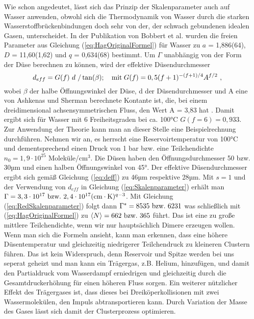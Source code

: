 Wie schon angedeutet, lässt sich das Prinzip der Skalenparameter auch auf Wasser anwenden, obwohl sich die Thermodynamik von Wasser durch die starken Wasserstoffbrückenbindungen doch sehr von der, der schwach gebundenen idealen Gasen, unterscheidet. In der Publikation von Bobbert et al. \cite{bobbert2002} wurden die freien Parameter aus Gleichung (\ref{eq:HagOriginalFormel}) für Wasser zu $a$ = 1,886(64), $D$ = 11,60(1,62) und $q$ = 0,634(68) bestimmt. Um $\Gamma$ unabhängig von der Form der Düse berechnen zu können, wird der effektive Düsendurchmesser
%
\begin{equation} \label{eq:deff}
d_{eff} = G(f)\ d\ /\tan(\beta); \quad \textmd{mit} \; G(f)= 0,5 (f+1)^{-(f+1)/4} A^{f/2} \ ,
\end{equation}
%
wobei $\beta$ der halbe Öffnungswinkel der Düse, d der Düsendurchmesser und A eine von Ashkenas und Sherman berechnete Kontante ist, die, bei einem dreidimensional achsensymmetrischen Fluss, den Wert A = 3,83 hat \cite{bobbert2002}. Damit ergibt sich für Wasser mit 6 Freiheitsgraden bei ca. 100°C $G(f=6)=0,933$. 
Zur Anwendung der Theorie kann man an dieser Stelle eine Beispielrechnung durchführen. Nehmen wir an, es herrscht eine Reservoirtemperatur von 100°C und dementsprechend einen Druck von 1 bar bzw. eine Teilchendichte $n_0 = 1,9 \cdot 10^{25}$ Moleküle/cm$^{3}$. Die Düsen haben den Öffnungsdurchmesser 50 bzw. 30µm und einen halben Öffnungswinkel von 45°. Der effektive Düsendurchmesser ergibt sich gemäß Gleichung (\ref{eq:deff}) zu 46µm respektive 28µm. Mit $s = 1$ und der Verwendung von $d_{eff}$ in Gleichung (\ref{eq:Skalenparameter}) erhält man $\Gamma = 3,3 \cdot 10^{17}\ \textmd{bzw.} \ 2,4 \cdot 10^{17} (\mathrm{cm}\cdot \mathrm{K})^{q-3}$. Mit Gleichung (\ref{eq:RedSkalenparameter}) folgt dann $\Gamma^* = 8535\ \textmd{bzw.}\ 6231$ was schließlich mit (\ref{eq:HagOriginalFormel}) zu $\left\langle N \right\rangle = 662\ \textmd{bzw.} \ 365$ führt.
Das ist eine zu große mittlere Teilchendichte, wenn wir nur hauptsächlich Dimere erzeugen wollen. Wenn man sich die Formeln ansieht, kann man erkennen, dass eine höhere Düsentemperatur und gleichzeitig niedrigerer Teilchendruck zu kleineren Clustern führen. Das ist kein Widerspruch, denn Reservoir und Spitze werden bei uns seperat geheizt und man kann ein Trägergas, z.B. Helium, hinzufügen, und damit den Partialdruck vom Wasserdampf erniedrigen und gleichzeitig durch die Gesamtdruckerhöhung für einen höheren Fluss sorgen. Ein weiterer nützlicher Effekt des Trägergases ist, dass dieses bei Dreiköperkollisionen mit zwei Wassermolekülen, den Impuls abtransportieren kann. Durch Variation der Masse des Gases lässt sich damit der Clusterprozess optimieren.
